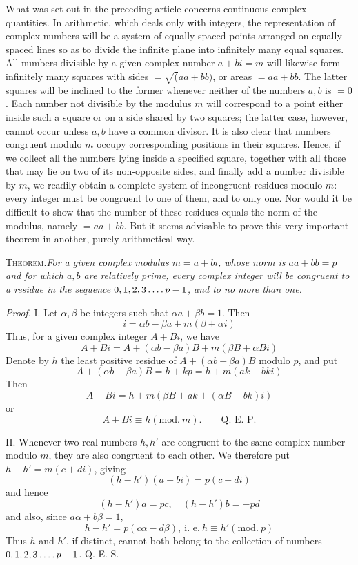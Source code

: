 What was set out in the preceding article concerns continuous complex quantities. In arithmetic, which deals only with integers, the representation of complex numbers will be a system of equally spaced points arranged on equally spaced lines so as to divide the infinite plane into infinitely many equal squares. All numbers divisible by a given complex number $a+bi=m$ will likewise form infinitely many squares with sides $=\surd(aa+bb)$, or areas $=aa+bb$. The latter squares will be inclined to the former whenever neither of the numbers $a,b$ is $=0$. Each number not divisible by the modulus $m$ will correspond to a point either inside such a square or on a side shared by two squares; the latter case, however, cannot occur unless $a,b$ have a common divisor. It is also clear that numbers congruent modulo $m$ occupy corresponding positions in their squares. Hence, if we collect all the numbers lying inside a specified square, together with all those that may lie on two of its non-opposite sides, and finally add a number divisible by $m$, we readily obtain a complete system of incongruent residues modulo $m$: every integer must be congruent to one of them, and to only one. Nor would it be difficult to show that the number of these residues equals the norm of the modulus, namely $=aa+bb$. But it seems advisable to prove this very important theorem in another, purely arithmetical way.

\textsc{Theorem.}\quad\emph{For a given complex modulus $m=a+bi$, whose norm is $aa+bb=p$ and for which $a,b$ are relatively prime, every complex integer will be congruent to a residue in the sequence $0,1,2,3\mathinner{.\,.\,.\,.} p-1$, and to no more than one.}


%
\emph{Proof.} I. Let $\alpha,\beta$ be integers such that $\alpha a+\beta b=1$. Then
\[
i=\alpha b-\beta a+m(\beta+\alpha i)
\]
Thus, for a given complex integer $A+Bi$, we have
\[
A+Bi=A+(\alpha b-\beta a)B+m(\beta B+\alpha Bi)
\]
Denote by $h$ the least positive residue of $A+(\alpha b-\beta a)B$ modulo $p$, and put
\[
A+(\alpha b-\beta a)B=h+kp=h+m(ak-bki)
\]
Then
\[
A+Bi=h+m(\beta B+ak+(\alpha B-bk)i)
\]
or
\[
A+Bi\equiv h(\mathrm{mod.}\ m).\qquad\text{Q. E. P.}
\]

II. Whenever two real numbers $h,h'$ are congruent to the same complex number modulo $m$, they are also congruent to each other. We therefore put $h-h'=m(c+di)$, giving
\[
(h-h')(a-bi)=p(c+di)
\]
and hence
\[
(h-h')a=pc,\quad(h-h')b=-pd
\]
and also, since $a\alpha+b\beta=1$,
\[
h-h'=p(c\alpha-d\beta),\ \text{i. e.}\ h\equiv h'(\mathrm{mod.}\ p)
\]
Thus $h$ and $h'$, if distinct, cannot both belong to the collection of numbers $0,1,2,3\mathinner{.\,.\,.\,.} p-1$. Q. E. S.

